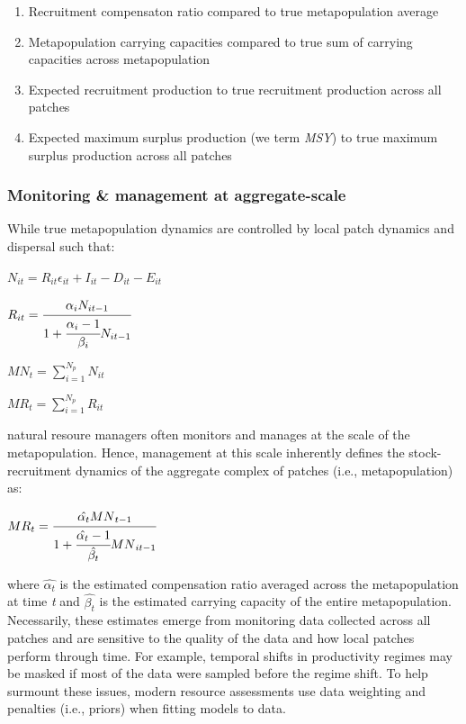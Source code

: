 \documentclass[]{article}
\providecommand{\tightlist}{%
  \setlength{\itemsep}{0pt}\setlength{\parskip}{0pt}}
\begin{document}
\begin{enumerate}
  \begin{enumerate}
  \def\labelenumii{\alph{enumii}.}
  \tightlist
  \item
    Recruitment compensaton ratio compared to true metapopulation
    average
  \item
    Metapopulation carrying capacities compared to true sum of carrying
    capacities across metapopulation
  \item
    Expected recruitment production to true recruitment production
    across all patches
  \item
    Expected maximum surplus production (we term \emph{MSY}) to true
    maximum surplus production across all patches
  \end{enumerate}
\end{enumerate}

\hypertarget{monitoring-management-at-aggregate-scale}{%
\subsubsection{Monitoring \& management at
aggregate-scale}\label{monitoring-management-at-aggregate-scale}}

While true metapopulation dynamics are controlled by local patch
dynamics and dispersal such that:

\(N_{it}= R_{it}\epsilon_{it}+I_{it}-D_{it}-E_{it}\)

\(R_{it}=\cfrac{\alpha_iN_{it-1}}{1+\cfrac{\alpha_i-1}{\beta_i}N_{it-1}}\)

\({MN}_t = \sum_{i=1}^{N_p} N_{it}\)

\({MR}_t = \sum_{i=1}^{N_p} R_{it}\)

natural resoure managers often monitors and manages at the scale of the
metapopulation. Hence, management at this scale inherently defines the
stock-recruitment dynamics of the aggregate complex of patches (i.e.,
metapopulation) as:

\({MR}_{t}=\cfrac{\hat{\alpha_t}{MN}_{t-1}}{1+\cfrac{\hat{\alpha_t}-1}{\hat{\beta_t}}{MN}_{it-1}}\)

where \(\hat{\alpha_t}\) is the estimated compensation ratio averaged
across the metapopulation at time \emph{t} and \(\hat{\beta_t}\) is the
estimated carrying capacity of the entire metapopulation. Necessarily,
these estimates emerge from monitoring data collected across all patches
and are sensitive to the quality of the data and how local patches
perform through time. For example, temporal shifts in productivity
regimes may be masked if most of the data were sampled before the regime
shift. To help surmount these issues, modern resource assessments use
data weighting and penalties (i.e., priors) when fitting models to data.
\end{document}
